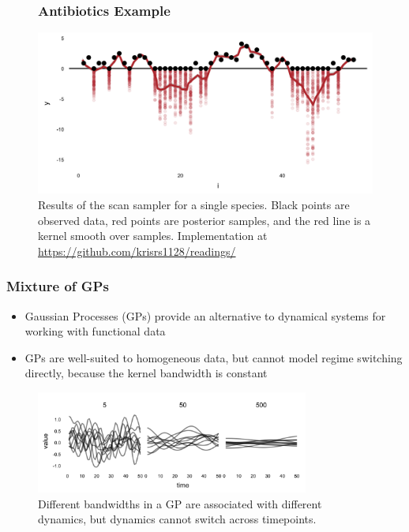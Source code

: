 \documentclass{beamer}
\begin{document}
\begin{figure}
  \frametitle{Antibiotics Example}
  \centering
  \includegraphics[width=\textwidth]{figure/abt_scan}
  \caption{Results of the scan sampler for a single species. Black points are
    observed data, red points are posterior samples, and the red line is a
    kernel smooth over samples. Implementation at
    \url{https://github.com/krisrs1128/readings/} \label{fig:abt_scan}
  }
\end{figure}

\begin{frame}
  \frametitle{Mixture of GPs}
 \begin{itemize}
 \item Gaussian Processes (GPs) provide an alternative to dynamical systems for
   working with functional data
 \item GPs are well-suited to homogeneous data, but cannot model regime
   switching directly, because the kernel bandwidth is constant
 \end{itemize}
\begin{figure}[ht]
  \centering
  \includegraphics[width=0.8\textwidth]{figure/gp_bandwidths}
  \caption{Different bandwidths in a GP are associated with different dynamics,
    but dynamics cannot switch across timepoints. \label{fig:gp_bandwidths} }
\end{figure}

\end{frame}
\end{document}
